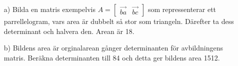 \begin{itemize}
	\item[a) ] Bilda en matris exempelvis $A=\begin{bmatrix}\vec{ba}&\vec{bc}\end{bmatrix}$ som repressenterar ett parrellelogram, vars area är dubbelt så stor som triangeln. Därefter ta dess determinant och halvera den. Arean är 18. 
	\item[b) ] Bildens area är orginalarean gånger determinanten för avbildningens matris. Beräkna determinanten till 84 och detta ger bildens area 1512.
\end{itemize}